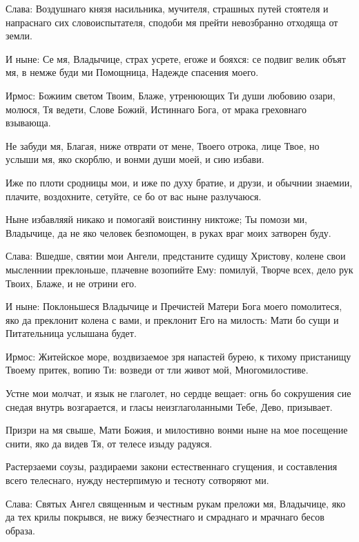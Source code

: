 Слава: Воздушнаго князя насильника, мучителя, страшных путей стоятеля и напраснаго сих словоиспытателя, сподоби мя прейти невозбранно отходяща от земли.


И ныне: Се мя, Владычице, страх усрете, егоже и бояхся: се подвиг велик объят мя, в немже буди ми Помощница, Надежде спасения моего.




Ирмос: Божиим светом Твоим, Блаже, утренюющих Ти души любовию озари, молюся, Тя ведети, Слове Божий, Истиннаго Бога, от мрака греховнаго взывающа.


\medskip


Не забуди мя, Благая, ниже отврати от мене, Твоего отрока, лице Твое, но услыши мя, яко скорблю, и вонми души моей, и сию избави.


Иже по плоти сродницы мои, и иже по духу братие, и друзи, и обычнии знаемии, плачите, воздохните, сетуйте, се бо от вас ныне разлучаюся.


Ныне избавляяй никако и помогаяй воистинну никтоже; Ты помози ми, Владычице, да не яко человек безпомощен, в руках враг моих затворен буду.


Слава: Вшедше, святии мои Ангели, предстаните судищу Христову, колене свои мысленнии преклоньше, плачевне возопийте Ему: помилуй, Творче всех, дело рук Твоих, Блаже, и не отрини его.


И ныне: Поклоньшеся Владычице и Пречистей Матери Бога моего помолитеся, яко да преклонит колена с вами, и преклонит Его на милость: Мати бо сущи и Питательница услышана будет.




Ирмос: Житейское море, воздвизаемое зря напастей бурею, к тихому пристанищу Твоему притек, вопию Ти: возведи от тли живот мой, Многомилостиве.


\medskip


Устне мои молчат, и язык не глаголет, но сердце вещает: огнь бо сокрушения сие снедая внутрь возгарается, и гласы неизглаголанными Тебе, Дево, призывает.


Призри на мя свыше, Мати Божия, и милостивно вонми ныне на мое посещение снити, яко да видев Тя, от телесе изыду радуяся.


Растерзаеми соузы, раздираеми закони естественнаго сгущения, и составления всего телеснаго, нужду нестерпимую и тесноту сотворяют ми.


Слава: Святых Ангел священным и честным рукам преложи мя, Владычице, яко да тех крилы покрывся, не вижу безчестнаго и смраднаго и мрачнаго бесов образа.


